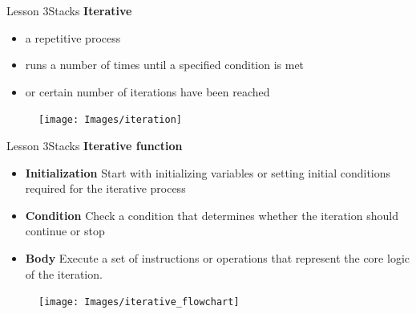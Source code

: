 \documentclass[aspectratio=1610]{beamer}
\begin{document}
\begin{frame}{Lesson 3}{Stacks}
\LARGE
\textbf{Iterative}\\
\begin{minipage}{0.60\textwidth}
\begin{itemize}
    \item a repetitive process
    \item runs a number of times until a specified condition is met
    \item or certain number of iterations have been reached
\end{itemize}
  \end{minipage}
\begin{minipage}{.0\textwidth}
      \begin{figure}
        \texttt{[image: Images/iteration]}
      \end{figure}
  \end{minipage}  
\end{frame}



\begin{frame}{Lesson 3}{Stacks}
\LARGE
\textbf{Iterative function}\\
\begin{minipage}{0.60\textwidth}
\Large
\begin{itemize}
    \item \textbf{Initialization} Start with initializing variables or setting initial conditions required for the iterative process
    \item \textbf{Condition} Check a condition that determines whether the iteration should continue or stop
    \item \textbf{Body} Execute a set of instructions or operations that represent the core logic of the iteration. 
\end{itemize}
  \end{minipage}
\begin{minipage}{.0\textwidth}
      \begin{figure}
        \texttt{[image: Images/iterative\_flowchart]}
      \end{figure}
  \end{minipage}  
\end{frame}
\end{document}
